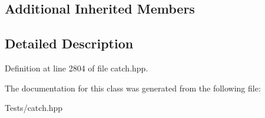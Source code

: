 \subsection*{Additional Inherited Members}


\subsection{Detailed Description}


Definition at line 2804 of file catch.\+hpp.



The documentation for this class was generated from the following file\+:\begin{DoxyCompactItemize}
\item 
Tests/catch.\+hpp\end{DoxyCompactItemize}
